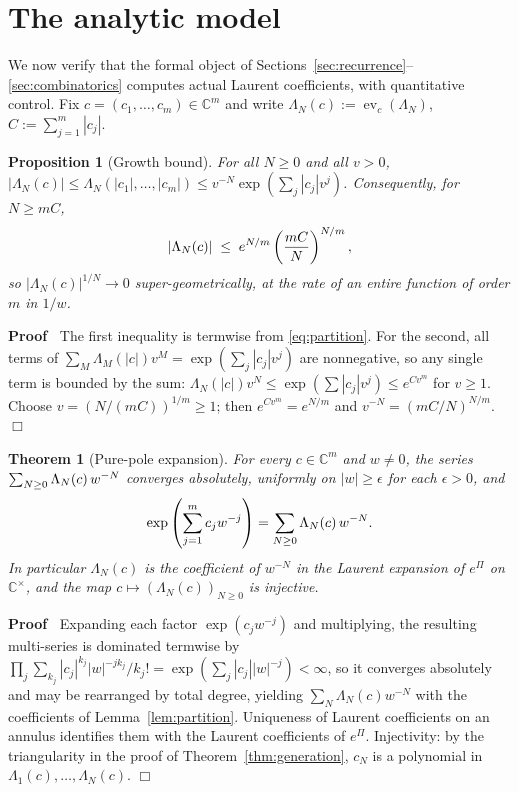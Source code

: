 \documentclass{article}
\newcommand{\assign}{:=}
\newcommand{\tmem}[1]{{\em #1\/}}
\newcommand{\tmop}[1]{\ensuremath{\operatorname{#1}}}
\newenvironment{proof}{\noindent\textbf{Proof\ }}{\hspace*{\fill}$\Box$\medskip}
\newtheorem{proposition}{Proposition}
{\theorembodyfont{\rmfamily}\newtheorem{remark}{Remark}}
\newtheorem{theorem}{Theorem}
\newcommand{\ev}{\tmop{ev}}
\newcommand{\C}{\mathbb{C}}
\begin{document}
\section{The analytic model}\label{sec:model}

We now verify that the formal object of
Sections~\ref{sec:recurrence}--\ref{sec:combinatorics} computes actual Laurent
coefficients, with quantitative control. Fix $c = (c_1, \ldots, c_m) \in \C^m$
and write $\Lambda_N (c) \assign \ev_c (\Lambda_N)$, $C \assign \sum_{j = 1}^m
|c_j |$.

\begin{proposition}
  [Growth bound]\label{prop:growth} For all $N \ge 0$ and all $v > 0$, $|
  \Lambda_N (c) | \le \Lambda_N  (|c_1 |, \ldots, |c_m |) \le v^{- N} \exp
  \left( \sum_j |c_j |v^j \right)$. Consequently, for $N \ge mC$,
  \[ | \Lambda_N (c) | \hspace{0.27em} \le \hspace{0.27em} e^{N / m} \left(
     \frac{mC}{N} \right)^{N / m}, \]
  so $| \Lambda_N (c) |^{1 / N} \to 0$ super-geometrically, at the rate of an
  entire function of order $m$ in $1 / w$.
\end{proposition}

\begin{proof}
  The first inequality is termwise from \eqref{eq:partition}. For the second,
  all terms of $\sum_M \Lambda_M (|c|) v^M = \exp (\sum_j |c_j |v^j)$ are
  nonnegative, so any single term is bounded by the sum: $\Lambda_N (|c|) v^N
  \le \exp (\sum |c_j |v^j) \le e^{Cv^m}$ for $v \ge 1$. Choose $v = (N /
  (mC))^{1 / m} \ge 1$; then $e^{Cv^m} = e^{N / m}$ and $v^{- N} = (mC / N)^{N
  / m}$.
\end{proof}

\begin{theorem}
  [Pure-pole expansion]\label{thm:analyticmodel} For every $c \in \C^m$ and $w
  \ne 0$, the series $\sum_{N \ge 0} \Lambda_N (c)  \hspace{0.17em} w^{- N}$
  converges absolutely, uniformly on $|w| \ge \epsilon$ for each $\epsilon >
  0$, and
  \[ \exp \left( \sum_{j = 1}^m c_j w^{- j} \right) = \sum_{N \ge 0} \Lambda_N
     (c)  \hspace{0.17em} w^{- N} . \]
  In particular $\Lambda_N (c)$ {\tmem{is}} the coefficient of $w^{- N}$ in
  the Laurent expansion of $e^{\Pi}$ on $\C^{\times}$, and the map $c \mapsto
  (\Lambda_N (c))_{N \ge 0}$ is injective.
\end{theorem}

\begin{proof}
  Expanding each factor $\exp (c_j w^{- j})$ and multiplying, the resulting
  multi-series is dominated termwise by $\prod_j \sum_{k_j} |c_j |^{k_j}
  |w|^{- jk_j} / k_j ! = \exp (\sum_j |c_j ||w|^{- j}) < \infty$, so it
  converges absolutely and may be rearranged by total degree, yielding $\sum_N
  \Lambda_N (c) w^{- N}$ with the coefficients of Lemma~\ref{lem:partition}.
  Uniqueness of Laurent coefficients on an annulus identifies them with the
  Laurent coefficients of $e^{\Pi}$. Injectivity: by the triangularity in the
  proof of Theorem~\ref{thm:generation}, $c_N$ is a polynomial in $\Lambda_1
  (c), \ldots, \Lambda_N (c)$.
\end{proof}
\end{document}
